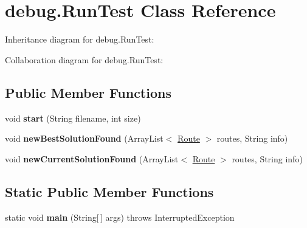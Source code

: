 \hypertarget{classdebug_1_1_run_test}{}\section{debug.\+Run\+Test Class Reference}
\label{classdebug_1_1_run_test}


Inheritance diagram for debug.\+Run\+Test\+:


Collaboration diagram for debug.\+Run\+Test\+:
\subsection*{Public Member Functions}
\begin{DoxyCompactItemize}
\item 
void {\bfseries start} (String filename, int size)\hypertarget{classdebug_1_1_run_test_a1bae0bdd2e10b641cf42ac2b6990c8f9}{}\label{classdebug_1_1_run_test_a1bae0bdd2e10b641cf42ac2b6990c8f9}

\item 
void {\bfseries new\+Best\+Solution\+Found} (Array\+List$<$ \hyperlink{classsvrptw_1_1_route}{Route} $>$ routes, String info)\hypertarget{classdebug_1_1_run_test_a571bbd0eb457209cc95fd7f238b567ab}{}\label{classdebug_1_1_run_test_a571bbd0eb457209cc95fd7f238b567ab}

\item 
void {\bfseries new\+Current\+Solution\+Found} (Array\+List$<$ \hyperlink{classsvrptw_1_1_route}{Route} $>$ routes, String info)\hypertarget{classdebug_1_1_run_test_ab253fe7bf8a3d9b42070fac92e15e77c}{}\label{classdebug_1_1_run_test_ab253fe7bf8a3d9b42070fac92e15e77c}

\end{DoxyCompactItemize}
\subsection*{Static Public Member Functions}
\begin{DoxyCompactItemize}
\item 
static void {\bfseries main} (String\mbox{[}$\,$\mbox{]} args)  throws Interrupted\+Exception \hypertarget{classdebug_1_1_run_test_a4917937f42e5254d6bc7f2fb11d4e839}{}\label{classdebug_1_1_run_test_a4917937f42e5254d6bc7f2fb11d4e839}

\end{DoxyCompactItemize}
